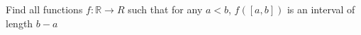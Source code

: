 Find all functions $f: \mathbb{R}\to{R}$ such that for any $a<b$, $f([a,b])$ is an interval of length $b-a$